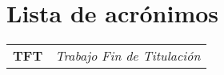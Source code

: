 \chapter*{Lista de acrónimos}

\begin{longtable}{ll}
\endfirsthead
%
\endhead
%
\textbf{TFT}    & \textit{Trabajo Fin de Titulación}                    \\
\end{longtable}